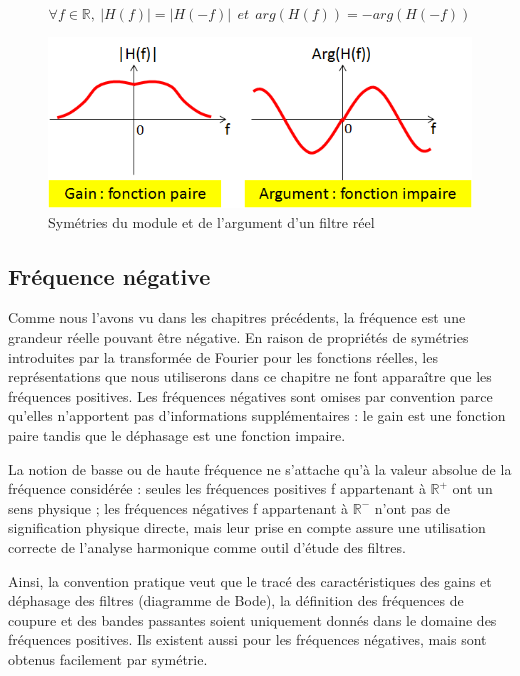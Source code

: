 	\begin{equation}\label{key}
	\forall f \in \mathbb{R},~|H(f)| = |H(-f)| ~~et~~arg(H(f)) = -arg(H(-f))
	\end{equation}
	
	\begin{figure}[h]
		\centering
		\includegraphics[scale=0.6]{images/symetrie_filtre_reel.png}
		\caption{Symétries du module et de l'argument d'un filtre réel}	
		\label{Fig:symetrie_filtre_reel} 
	\end{figure}
	 
	
	\subsection{Fréquence négative}
	
	Comme nous l'avons vu dans les chapitres précédents, la fréquence est une grandeur réelle pouvant être négative. En raison de propriétés de symétries introduites par la transformée de Fourier pour les fonctions réelles, les représentations que nous utiliserons dans ce chapitre ne font apparaître que les fréquences positives. Les fréquences négatives sont omises par convention parce qu'elles n'apportent pas d'informations supplémentaires : le gain est une fonction paire tandis que le déphasage est une fonction impaire.
	
	La notion de basse ou de haute fréquence ne s’attache qu’à la valeur absolue de la fréquence considérée : seules les fréquences positives f appartenant à $\mathbb{R}^{+}$ ont un sens physique ; les fréquences négatives f appartenant à $\mathbb{R}^{-}$ n’ont pas de signification physique directe, mais leur prise en compte assure une utilisation correcte de l’analyse harmonique comme outil d’étude des filtres.
	
	Ainsi, la convention pratique veut que le tracé des caractéristiques des gains et déphasage des filtres (diagramme de Bode), la définition des fréquences de coupure et des bandes passantes soient uniquement donnés dans le domaine des fréquences positives. Ils existent aussi pour les fréquences négatives, mais sont obtenus facilement par symétrie.
	
